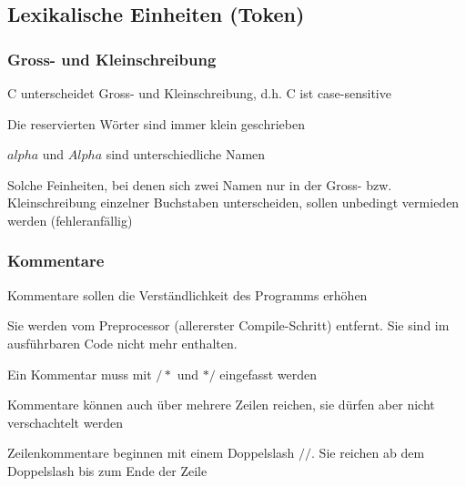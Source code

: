  	\subsection{Lexikalische Einheiten (Token) }
 		\subsubsection{Gross- und Kleinschreibung}
 			\begin{compactitem}
 				\item C unterscheidet Gross- und Kleinschreibung, d.h. C ist case-sensitive
 				\item Die reservierten Wörter sind immer klein geschrieben
 				\item $alpha$ und $Alpha$ sind unterschiedliche Namen
 				\item Solche Feinheiten, bei denen sich zwei Namen nur in der Gross- bzw. Kleinschreibung einzelner Buchstaben unterscheiden, sollen unbedingt vermieden werden (fehleranfällig)
 			\end{compactitem}
 		\subsubsection{Kommentare}
 			\begin{compactitem}
 				\item Kommentare sollen die Verständlichkeit des Programms erhöhen
 				\item Sie werden vom Preprocessor (allererster Compile-Schritt) entfernt. Sie sind im
 				ausführbaren Code nicht mehr enthalten.
 				\item Ein Kommentar muss mit
 				$/*$ und $*/$ eingefasst werden
 				\item Kommentare können auch über mehrere Zeilen reichen, sie dürfen aber nicht
 				verschachtelt werden
 				\item Zeilenkommentare beginnen mit einem Doppelslash
 				$//$. Sie reichen ab dem
 				Doppelslash bis zum Ende der Zeile
 			\end{compactitem}
